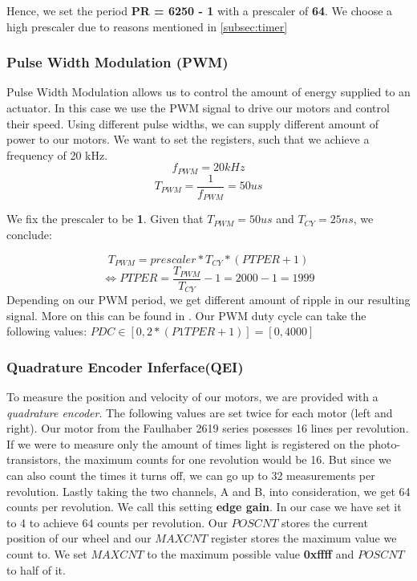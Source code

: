 \noindent
Hence, we set the period \textbf{PR = 6250 - 1} with a prescaler of \textbf{64}. We choose a high prescaler due to reasons mentioned in \ref{subsec:timer}

\subsubsection*{Pulse Width Modulation (PWM)}

Pulse Width Modulation allows us to control the amount of energy supplied to an actuator. In this case we use the PWM signal to drive our motors and control their speed. Using different pulse widths, we can supply different amount of power to our motors. \cite{alex}
\vskip 0.1in
\noindent
We want to set the registers, such that we achieve a frequency of 20 kHz.
$$f_{PWM} = 20 kHz$$
$$T_{PWM} = \frac{1}{f_{PWM}} = 50 us$$

\noindent
We fix the prescaler to be \textbf{1}. Given that $T_{PWM} = 50 us$ and $T_{CY}=25 ns$, we conclude:

$$T_{PWM} = prescaler * T_{CY} * (PTPER + 1)$$
$$\iff PTPER = \frac{T_{PWM}}{T_{CY}} - 1  = 2000 - 1 = 1999$$
\vskip 0.1in
\noindent
Depending on our PWM period, we get different amount of ripple in our resulting signal. More on this can be found in \cite[Chapter~5.1]{alex}.
\vskip 0.1in
\noindent
Our PWM duty cycle can take the following values: $PDC \in [0, 2*(P1TPER + 1)] = [0, 4000]$


\subsubsection*{Quadrature Encoder Inferface(QEI)}
To measure the position and velocity of our motors, we are provided with a \textit{quadrature encoder}.
The following values are set twice for each motor (left and right).
\vskip 0.1in
\noindent
Our motor from the Faulhaber 2619 series posesses 16 lines per revolution. If we were to measure only the amount of times light is registered on the photo-transistors, the maximum counts for one revolution would be 16. But since we can also count the times it turns off, we can go up to 32 measurements per revolution. Lastly taking the two channels, A and B, into consideration, we get 64 counts per revolution.
\vskip 0.1in
\noindent
We call this setting \textbf{edge gain}. In our case we have set it to 4 to achieve 64 counts per revolution.
\vskip 0.1in
\noindent
Our $POSCNT$ stores the current position of our wheel and our $MAXCNT$ register stores the maximum value we count to.
\vskip 0.1in
\noindent
We set $MAXCNT$ to the maximum possible value \textbf{0xffff} and $POSCNT$ to half of it.


